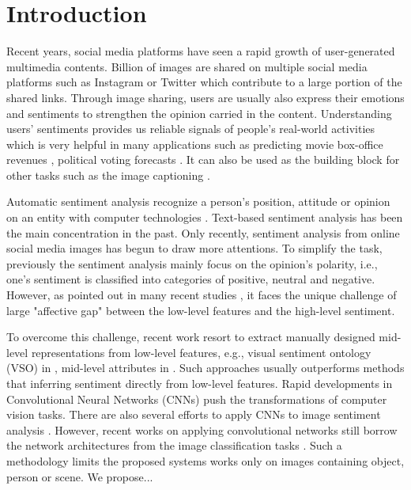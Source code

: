 \section{Introduction}
\label{introduction}

Recent years, social media platforms have seen a rapid growth of user-generated multimedia contents. Billion of images are shared on multiple social media platforms such as Instagram or Twitter which contribute to a large portion of the shared links. Through image sharing, users are usually also express their emotions and sentiments to strengthen the opinion carried in the content. Understanding users' sentiments provides us reliable signals of people's real-world activities which is very helpful in many applications such as predicting movie box-office revenues \cite{asur2010predicting}, political voting forecasts \cite{o2010tweets}. It can also be used as the building block for other tasks such as the image captioning \cite{vinyals2015show}.

Automatic sentiment analysis recognize a person's position, attitude or opinion on an entity with computer technologies \cite{soleymani2017survey}. Text-based sentiment analysis has been the main concentration in the past. Only recently, sentiment analysis from online social media images has begun to draw more attentions. To simplify the task, previously the sentiment analysis mainly focus on the opinion's polarity, i.e., one's sentiment is classified into categories of positive, neutral and negative. 
However, as pointed out in many recent studies \cite{borth2013large, yuan2013sentribute, chen2014deepsentibank, ahsan2017towards}, it faces the unique challenge of large "affective gap" between the low-level features and the high-level sentiment. 

To overcome this challenge, recent work resort to extract manually designed mid-level representations from low-level features, e.g., visual sentiment ontology (VSO) in \cite{borth2013large}, mid-level attributes in \cite{yuan2013sentribute}. Such approaches usually outperforms methods that inferring sentiment directly from low-level features. Rapid developments in Convolutional Neural Networks (CNNs) \cite{krizhevsky2012imagenet, szegedy2015going, simonyan2014very, he2016deep} push the transformations of computer vision tasks. There are also several efforts to apply CNNs to image sentiment analysis \cite{you2015robust, chen2014deepsentibank, campos2017pixels}. However, recent works on applying convolutional networks still borrow the network architectures from the image classification tasks \cite{you2015robust, chen2014deepsentibank, ahsan2017towards, campos2017pixels}. Such a methodology limits the proposed systems works only on images containing object, person or scene. We propose...
  
